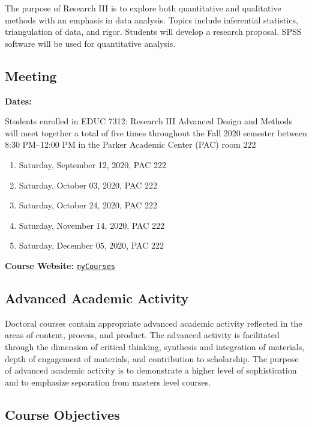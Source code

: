 \documentclass[
]{article}
\providecommand{\tightlist}{%
  \setlength{\itemsep}{0pt}\setlength{\parskip}{0pt}}
\begin{document}
The purpose of Research III is to explore both quantitative and
qualitative methods with an emphasis in data analysis. Topics include
inferential statistics, triangulation of data, and rigor. Students will
develop a research proposal. SPSS software will be used for quantitative
analysis.

\subsection{Meeting}

\textbf{Dates:}

Students enrolled in EDUC 7312: Research III Advanced Design and Methods
will meet together a total of five times throughout the Fall 2020
semester between 8:30 PM--12:00 PM in the Parker Academic Center (PAC)
room 222

\begin{enumerate}
\def\labelenumi{\arabic{enumi}.}
\tightlist
\item
  Saturday, September 12, 2020, PAC 222
\item
  Saturday, October 03, 2020, PAC 222
\item
  Saturday, October 24, 2020, PAC 222
\item
  Saturday, November 14, 2020, PAC 222
\item
  Saturday, December 05, 2020, PAC 222
\end{enumerate}

\textbf{Course Website:}
\texttt{\href{https://mycourses.umhb.edu/courses/23599}{myCourses}}

\newpage
\subsection{Advanced Academic Activity}

Doctoral courses contain appropriate advanced academic activity
reflected in the areas of content, process, and product. The advanced
activity is facilitated through the dimension of critical thinking,
synthesis and integration of materials, depth of engagement of
materials, and contribution to scholarship. The purpose of advanced
academic activity is to demonstrate a higher level of sophistication and
to emphasize separation from masters level courses.

\subsection{Course Objectives}
\end{document}
